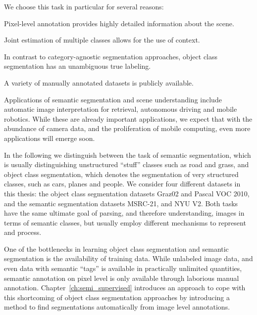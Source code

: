 We choose this task in particular for several reasons:
\begin{itemize*}
    \item Pixel-level annotation provides highly detailed information about the scene.
    \item Joint estimation of multiple classes allows for the use of context.
    \item In contrast to category-agnostic segmentation approaches, object class segmentation
        has an unambiguous true labeling.
    \item A variety of manually annotated datasets is publicly available.
\end{itemize*}
%
Applications of semantic segmentation and scene understanding include automatic
image interpretation for retrieval, autonomous driving and mobile robotics.
While these are already important applications, we expect that with the
abundance of camera data, and the proliferation of mobile computing, even
more applications will emerge soon.

In the following we distinguish between the task of semantic segmentation,
which is usually distinguishing unstructured ``stuff'' classes such as road and
grass, and object class segmentation, which denotes the segmentation of very
structured classes, such as cars, planes and people. We consider four
different datasets in this thesis: the object class segmentation datasets
Graz02 and Pascal VOC 2010, and the semantic segmentation datasets MSRC-21, and
NYU V2.
%
Both tasks have the same ultimate goal of parsing, and therefore understanding,
images in terms of semantic classes, but usually employ  different mechanisms
to represent and process.

One of the bottlenecks in learning object class segmentation and semantic
segmentation is the availability of training data.  While unlabeled image data,
and even data with semantic
``tags'' is available in practically unlimited quantities, semantic annotation
on pixel level is only available through laborious manual annotation. 
Chapter~\ref{ch:semi_supervised} introduces an approach to cope with this
shortcoming of object class segmentation approaches by introducing a method to
find segmentations automatically from image level annotations.

